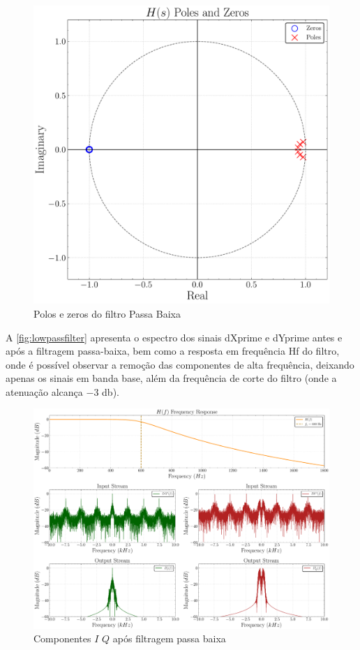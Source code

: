 \begin{figure}[H]
    \centering
    \caption{Polos e zeros do filtro Passa Baixa}\label{fig:butterworth_poles}
    \includegraphics[width=0.8\linewidth]{assets/cap2/example_lpf_pz.pdf}
\end{figure}

A \autoref{fig:lowpassfilter} apresenta o espectro dos sinais \gls{dXprime} e \gls{dYprime} antes e após a filtragem passa-baixa, bem como a resposta em frequência \gls{Hf} do filtro, onde é possível observar a remoção das componentes de alta frequência, deixando apenas os sinais em banda base, além da frequência de corte do filtro (onde a atenuação alcança $-3$ \gls{db}).

\begin{figure}[H]
	\centering
	\caption{Componentes $I$ $Q$ após filtragem passa baixa}\label{fig:lowpassfilter}
	\includegraphics[width=\linewidth]{assets/cap2/receiver_lpf_freq.pdf}
\end{figure}

